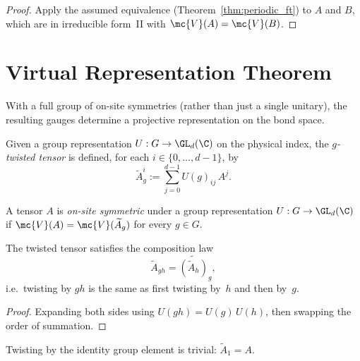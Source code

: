 \begin{proof}\leanok
    Apply the assumed equivalence (Theorem~\ref{thm:periodic_ft}) to $A$
    and $B$, which are in irreducible form~II with $\mc{V}(A) = \mc{V}(B)$.
\end{proof}

\section{Virtual Representation Theorem}\label{sec:injective_symmetry_cocycle}

With a full group of on-site symmetries (rather than just a single
unitary), the resulting gauges determine a projective representation
on the bond space.

\begin{definition}\label{def:twisted_tensor}
    \leanok
    Given a group representation $U : G \to \GL_{d}(\C)$ on the physical
    index, the \emph{$g$-twisted tensor} is defined, for each
    $i \in \{0,\ldots,d{-}1\}$, by
    \[
        \widetilde{A}_g^i :=  \sum_{j=0}^{d-1} U(g)_{ij}\, A^j.
    \]
\end{definition}

\begin{definition}\label{def:on_site_symmetric}
    \leanok
    A tensor $A$ is \emph{on-site symmetric} under a group
    representation $U : G \to \GL_{d}(\C)$ if $\mc{V}(A) = \mc{V}(\widetilde{A}_g)$
    for every $g \in G$.
\end{definition}

\begin{lemma}\label{lem:twisted_tensor_mul}
    \leanok
    The twisted tensor satisfies the composition law
    \[
        \widetilde{A}_{gh} =  \widetilde{(\widetilde{A}_h)}_g,
    \]
    i.e.\ twisting by $gh$ is the same as first twisting by~$h$
    and then by~$g$.
\end{lemma}

\begin{proof}\leanok{}
    Expanding both sides using $U(gh) = U(g)\, U(h)$, then swapping
    the order of summation.
\end{proof}

\begin{lemma}\label{lem:twisted_tensor_one}
    \leanok
    Twisting by the identity group element is trivial:
    $\widetilde{A}_1 = A$.
\end{lemma}

